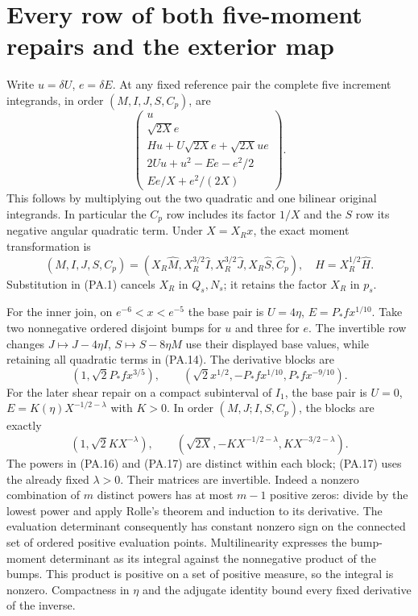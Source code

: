 \documentclass[10pt,a4paper]{article}
\begin{document}
\section{Every row of both five-moment repairs and the exterior map}
Write $u=\delta U$, $e=\delta E$. At any fixed reference pair the complete
five increment integrands, in order $(M,I,J,S,C_p)$, are
\[
 \begin{pmatrix}
 u\\ \sqrt{2X}e\\ Hu+U\sqrt{2X}e+\sqrt{2X}ue\\
 2Uu+u^2-Ee-e^2/2\\ Ee/X+e^2/(2X)
 \end{pmatrix}.                                                \tag{PA.14}
\]
This follows by multiplying out the two quadratic and one bilinear original
integrands. In particular the $C_p$ row includes its factor $1/X$ and the
$S$ row its negative angular quadratic term.
Under $X=X_Rx$, the exact moment transformation is
\[
 (M,I,J,S,C_p)
  =(X_R\widehat M,X_R^{3/2}\widehat I,X_R^{3/2}\widehat J,
     X_R\widehat S,\widehat C_p),\quad H=X_R^{1/2}\widehat H.     \tag{PA.15}
\]
Substitution in (PA.1) cancels $X_R$ in $Q_s,N_s$; it retains the factor
$X_R$ in $p_s$.

For the inner join, on $e^{-6}<x<e^{-5}$ the base pair is
$U=4\eta$, $E=P_*fx^{1/10}$. Take two nonnegative ordered disjoint
bumps for $u$ and three for $e$. The invertible row changes
$J\mapsto J-4\eta I$, $S\mapsto S-8\eta M$ use their displayed base
values, while retaining all quadratic terms in (PA.14). The derivative blocks are
\[
 (1,\sqrt2P_*f x^{3/5}),\qquad
 (\sqrt2x^{1/2},-P_*f x^{1/10},P_*f x^{-9/10}).                 \tag{PA.16}
\]
For the later shear repair on a compact subinterval of $I_1$, the base pair is
$U=0$, $E=K(\eta)X^{-1/2-\lambda}$ with $K>0$. In order $(M,J;I,S,C_p)$,
the blocks are exactly
\[
 (1,\sqrt2KX^{-\lambda}),\qquad
 (\sqrt{2X},-KX^{-1/2-\lambda},KX^{-3/2-\lambda}).              \tag{PA.17}
\]
The powers in (PA.16) and (PA.17) are distinct within each block; (PA.17) uses the
already fixed $\lambda>0$. Their matrices are invertible. Indeed a nonzero
combination of $m$ distinct powers has at most $m-1$ positive zeros: divide
by the lowest power and apply Rolle's theorem and induction to its derivative.
The evaluation determinant consequently has constant nonzero sign on the
connected set of ordered positive evaluation points. Multilinearity expresses
the bump-moment determinant as its integral against the nonnegative product of
the bumps. This product is positive on a set of positive measure, so the integral
is nonzero. Compactness in $\eta$ and the adjugate identity bound every fixed
derivative of the inverse.
\end{document}
